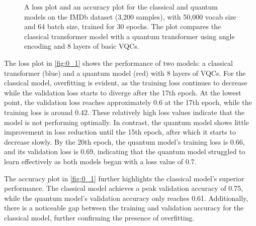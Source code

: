 \begin{figure}[h]
  \begin{center}
  \end{center}
  \vspace{-0.5cm}
  \caption{A loss plot and an accuracy plot for the classical and
    quantum models on the IMDb dataset (3,200 samples), with 50,000
    vocab size and 64 batch size, trained for 30 epochs. The plot
    compares the classical transformer model with a quantum transformer
  using angle encoding and 8 layers of basic \glspl{VQC}.}
  \label{fig:0_1}
\end{figure}

The loss plot in \autoref{fig:0_1} shows the performance of two models: a
classical transformer (blue) and a quantum model (red) with 8 layers
of VQCs. For
the classical model, overfitting is evident, as the training loss
continues to decrease while the validation loss starts to diverge
after the 17th epoch. At the lowest point, the validation loss
reaches approximately 0.6 at the 17th epoch, while the training loss
is around 0.42. These relatively high loss values indicate that the
model is not performing optimally. In contrast, the quantum model
shows little improvement in loss reduction until the 15th epoch,
after which it starts to decrease slowly. By the 20th epoch, the
quantum model's training loss is 0.66, and its validation loss is
0.69, indicating that the quantum model struggled to learn
effectively as both models began with a loss value of 0.7.

The accuracy plot in \autoref{fig:0_1} further highlights the
classical model's superior
performance. The classical model achieves a peak validation accuracy
of 0.75, while the quantum model's validation accuracy only reaches
0.61. Additionally, there is a noticeable gap between the training
and validation accuracy for the classical model, further confirming
the presence of overfitting.

